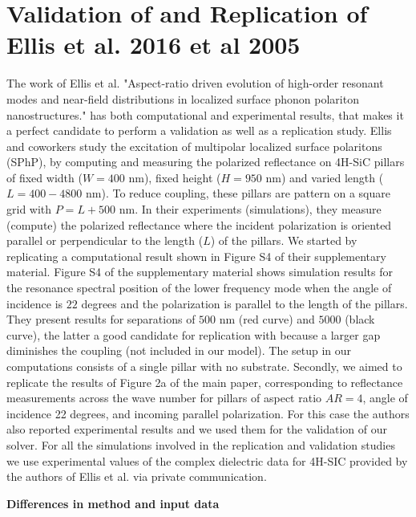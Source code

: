 
\section{Validation of \pygbe and Replication of Ellis et al. 2016  et al 2005} \label{sec:rep_val_ellis}
\graphicspath{{replication_validation/figs/}}

The work of Ellis et al. "Aspect-ratio driven evolution of high-order resonant modes and near-field distributions in
localized surface phonon polariton nanostructures." \cite{ellis2016} has both computational and experimental results, that makes 
it a perfect candidate to perform a validation as well as a replication study. Ellis and coworkers study the excitation of 
multipolar localized surface polaritons (SPhP), by computing and measuring the polarized reflectance on 4H-SiC pillars of
fixed width ($W = 400$ nm), fixed height ($H=950$ nm) and varied length ($L=400-4800$ nm). To reduce coupling, these pillars are 
pattern on a square grid with $P = L + 500$ nm. In their experiments (simulations), they measure (compute) the polarized reflectance
where the incident polarization is oriented parallel or perpendicular to the length ($L$) of the pillars. We started by replicating a 
computational result shown in Figure S4 of their supplementary material. Figure S4 of the 
supplementary material shows simulation results for the resonance spectral position of the lower frequency mode when the angle of 
incidence is $22$ degrees and the polarization is parallel to the length of the pillars. They present results for separations of $500$ nm 
(red curve) and $5000$ (black curve), the latter a good candidate for replication with \pygbe because a larger gap diminishes 
the coupling (not included in our model). The setup in our computations consists of a single pillar with no substrate.
Secondly, we aimed to replicate the results of Figure 2a of the main paper, 
corresponding to reflectance measurements across the wave number for pillars of aspect ratio $AR=4$, angle of incidence 22 degrees, 
and incoming parallel polarization. For this case the authors also reported experimental results and we used them for the 
validation of our solver. For all the simulations involved in the replication and validation studies we use experimental values of the 
complex dielectric data for 4H-SIC provided by the authors of Ellis et al. via private communication. 

\textbf{Differences in method and input data}

